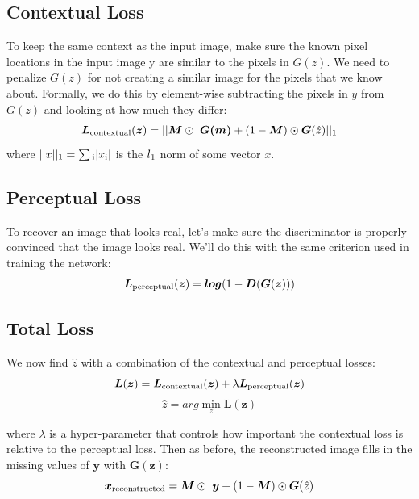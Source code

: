 \subsection{Contextual Loss} %
\label{sub:contextual_loss}
To keep the same context as the input image, make sure the known pixel locations in the input image y are similar to the pixels in $G(z)$. We need to penalize $G(z)$ for not creating a similar image for the pixels that we know about. Formally, we do this by element-wise subtracting the pixels in $y$ from $G(z)$ and looking at how much they differ:
\begin{equation} \label{eqn:contextual_loss}
\bm{L}\textsubscript{contextual}(\bm{z}) = || \bm{M} \odot\  \bm{G(m)} + (1 - \bm{M}) \odot \bm{G} (\hat z) || \textsubscript{1}
\end{equation}
where $||x|| \textsubscript{1}=\sum \textsubscript{i} |x \textsubscript{i}|$ is the $l \textsubscript{1}$ norm of some vector $x$.


\subsection{Perceptual Loss} %
\label{sub:perceptual_loss}
To recover an image that looks real, let’s make sure the discriminator is properly convinced that the image looks real. We’ll do this with the same criterion used in training the network:
\begin{equation} \label{eqn:perceptual_loss}
\bm{L}\textsubscript{perceptual}(\bm{z}) = \bm{log} (1 - \bm{D}(\bm{G}(\bm{z})))
\end{equation}

\subsection{Total Loss} %
\label{sub:total_loss}
We now find $\hat z$ with a combination of the contextual and perceptual losses:
\begin{equation} \label{eqn:total_loss}
\bm{L}(\bm{z}) = \bm{L}\textsubscript{contextual}(\bm{z}) + \lambda \bm{L}\textsubscript{perceptual}(\bm{z})
\end{equation}
\begin{equation} \label{eqn:minimization}
\hat z = arg \min_z \bm{L} (\bm{z})
\end{equation}

where $\lambda$ is a hyper-parameter that controls how important the contextual loss is relative to the perceptual loss. Then as before, the reconstructed image fills in the missing values of $\bm{y}$ with $\bm{G}(\bm{z})$:
\begin{equation} \label{eqn:reconstructed_image_final}
\bm{x} \textsubscript{reconstructed} = \bm{M} \odot\  \bm{y} + (1 - \bm{M}) \odot \bm{G} (\hat z)
\end{equation}

